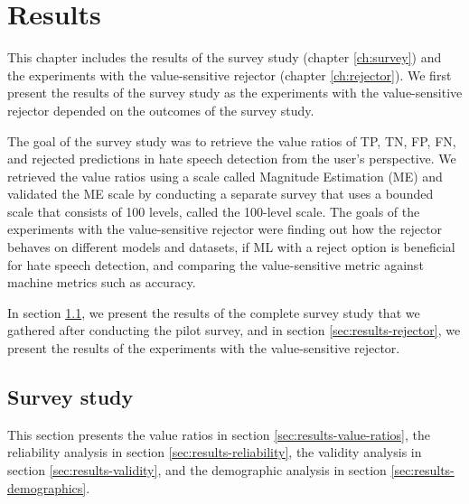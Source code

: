 \chapter{Results}
This chapter includes the results of the survey study (chapter \ref{ch:survey}) and the experiments with the value-sensitive rejector (chapter \ref{ch:rejector}).
%
We first present the results of the survey study as the experiments with the value-sensitive rejector depended on the outcomes of the survey study.
%

%
The goal of the survey study was to retrieve the value ratios of TP, TN, FP, FN, and rejected predictions in hate speech detection from the user's perspective.
%
We retrieved the value ratios using a scale called Magnitude Estimation (ME) and validated the ME scale by conducting a separate survey that uses a bounded scale that consists of 100 levels, called the 100-level scale.
%
The goals of the experiments with the value-sensitive rejector were finding out how the rejector behaves on different models and datasets, if ML with a reject option is beneficial for hate speech detection, and comparing the value-sensitive metric against machine metrics such as accuracy.
%

%
In section \ref{sec:results-survey-study}, we present the results of the complete survey study that we gathered after conducting the pilot survey, and in section \ref{sec:results-rejector}, we present the results of the experiments with the value-sensitive rejector.

\section{Survey study}
\label{sec:results-survey-study}
This section presents the value ratios in section \ref{sec:results-value-ratios}, the reliability analysis in section \ref{sec:results-reliability}, the validity analysis in section \ref{sec:results-validity}, and the demographic analysis in section \ref{sec:results-demographics}.
%


